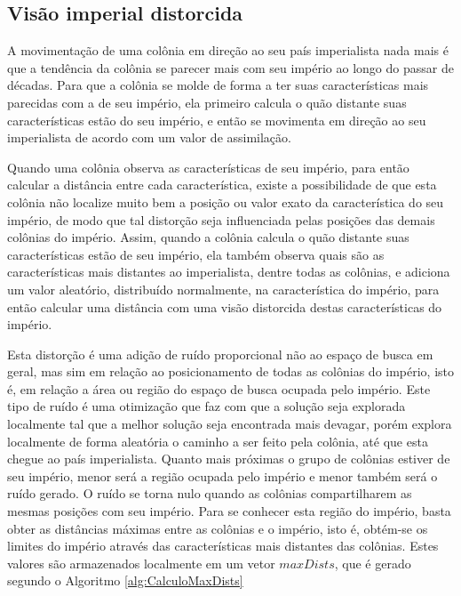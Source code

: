 \subsection{Visão imperial distorcida}
\label{Visão imperial distorcida}


A movimentação de uma colônia em direção ao seu país imperialista nada mais é que a tendência da colônia  se parecer mais com seu império ao longo do passar de décadas. Para que a colônia se molde de forma a ter suas características mais parecidas com a de seu império, ela primeiro calcula o quão distante suas características estão do seu império, e então se movimenta em direção ao seu imperialista de acordo com um valor de assimilação. 

Quando uma colônia observa as características de seu império, para então calcular a distância entre cada característica, existe a possibilidade de que esta colônia não localize muito bem a posição ou valor exato da característica do seu império, de modo que tal distorção seja influenciada pelas posições das demais colônias do império. Assim, quando a colônia calcula o quão distante suas características estão de seu império, ela também observa quais são as características mais distantes ao imperialista, dentre todas as colônias, e adiciona um valor aleatório, distribuído normalmente, na característica do império, para então calcular uma distância com uma visão distorcida destas características do império.

Esta distorção é uma adição de ruído proporcional não ao espaço de busca em geral, mas sim em relação ao posicionamento de todas as colônias do império, isto é, em relação a área ou região do espaço de busca ocupada pelo império. Este tipo de ruído é uma otimização que faz com que a solução seja explorada localmente tal que a melhor solução seja encontrada mais devagar, porém explora localmente de forma aleatória o caminho a ser feito pela colônia, até que esta chegue ao país imperialista. Quanto mais próximas o grupo de colônias estiver de seu império, menor será a região ocupada pelo império e menor também será o ruído gerado. O ruído se torna nulo quando as colônias compartilharem as mesmas posições com seu império. Para se conhecer esta região do império, basta obter as distâncias máximas entre as colônias e o império, isto é, obtém-se os limites do império através das características mais distantes das colônias. Estes valores são armazenados localmente em um vetor \(maxDists\), que é gerado segundo o Algoritmo \ref{alg:CalculoMaxDists}
    
